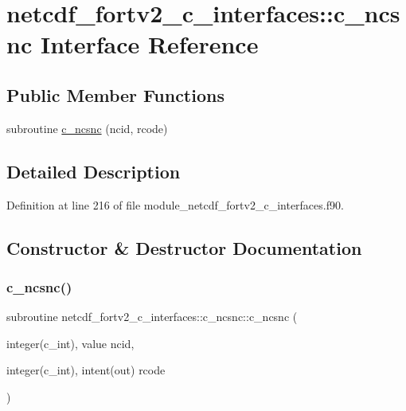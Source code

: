\hypertarget{interfacenetcdf__fortv2__c__interfaces_1_1c__ncsnc}{}\section{netcdf\+\_\+fortv2\+\_\+c\+\_\+interfaces\+:\+:c\+\_\+ncsnc Interface Reference}
\label{interfacenetcdf__fortv2__c__interfaces_1_1c__ncsnc}
\subsection*{Public Member Functions}
\begin{DoxyCompactItemize}
\item 
subroutine \hyperlink{interfacenetcdf__fortv2__c__interfaces_1_1c__ncsnc_a42d88fc64185b40aa9c9a62403346677}{c\+\_\+ncsnc} (ncid, rcode)
\end{DoxyCompactItemize}


\subsection{Detailed Description}


Definition at line 216 of file module\+\_\+netcdf\+\_\+fortv2\+\_\+c\+\_\+interfaces.\+f90.



\subsection{Constructor \& Destructor Documentation}
\mbox{\label{interfacenetcdf__fortv2__c__interfaces_1_1c__ncsnc_a42d88fc64185b40aa9c9a62403346677}} 
\subsubsection{\texorpdfstring{c\+\_\+ncsnc()}{c\_ncsnc()}}
{\footnotesize\ttfamily subroutine netcdf\+\_\+fortv2\+\_\+c\+\_\+interfaces\+::c\+\_\+ncsnc\+::c\+\_\+ncsnc (\begin{DoxyParamCaption}\item[{integer(c\+\_\+int), value}]{ncid,  }\item[{integer(c\+\_\+int), intent(out)}]{rcode }\end{DoxyParamCaption})}



